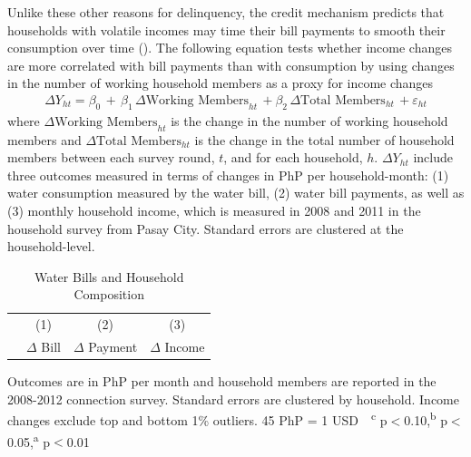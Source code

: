 \documentclass[12pt,table]{article}
\begin{document}


Unlike these other reasons for delinquency, the credit mechanism predicts that households with volatile incomes may time their bill payments to smooth their consumption over time (\cite{deaton1991saving}).  The following equation tests whether income changes are more correlated with bill payments than with consumption by using changes in the number of working household members as a proxy for income changes
\begin{align*}
\Delta Y_{ht} =\beta_0\,+\, \beta_1\, \Delta \text{Working Members}_{ht} \, + \beta_2\, \Delta \text{Total Members}_{ht}   \,+\varepsilon_{ht}
\end{align*}
where $ \Delta \text{Working Members}_{ht} $ is the change in the number of working household members and $\Delta \text{Total Members}_{ht}$ is the change in the total number of household members between each survey round, $t$, and for each household, $h$.  $\Delta Y_{ht}$ include three outcomes measured in terms of changes in PhP per household-month: (1) water consumption measured by the water bill, (2) water bill payments, as well as (3) monthly household income, which is measured in 2008 and 2011 in the household survey from Pasay City.  Standard errors are clustered at the household-level.

\begin{table}[!ht]
\small
\centering
\begin{threeparttable}
\caption{Water Bills and Household Composition}\label{table:panelanalysis}
\vspace{-2mm}
\begin{tabular}{@{}lccc@{}}
\toprule
 & \small (1) & \small (2) & \small (3)  \\
 & \small $\Delta$ Bill & \small $\Delta$ Payment & \small $\Delta$ Income \\[.5em]
 \toprule

\bottomrule
\end{tabular}
\begin{tablenotes}
\footnotesize
\item Outcomes are in PhP per month and household members are reported in the 2008-2012 connection survey.  Standard errors are clustered by household.  Income changes exclude top and bottom 1\% outliers.   45 PhP = 1 USD \,\, \textsuperscript{c} p$<$0.10,\textsuperscript{b} p$<$0.05,\textsuperscript{a} p$<$0.01 
\end{tablenotes}
\end{threeparttable}
\end{table}
\end{document}

